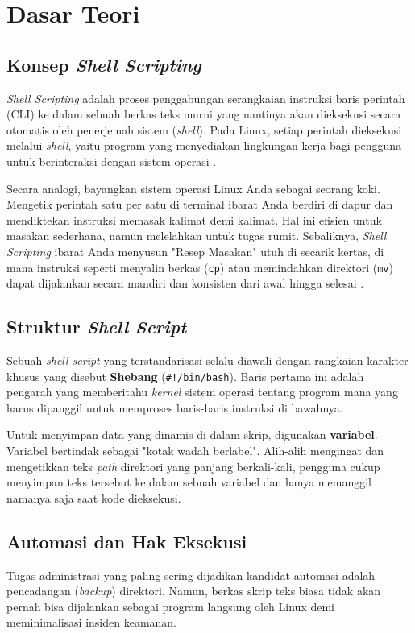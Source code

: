 \newpage
\section{Dasar Teori}

\subsection{Konsep \textit{Shell Scripting}}
\textit{Shell Scripting} adalah proses penggabungan serangkaian instruksi baris perintah (CLI) ke dalam sebuah berkas teks murni yang nantinya akan dieksekusi secara otomatis oleh penerjemah sistem (\textit{shell}). Pada Linux, setiap perintah dieksekusi melalui \textit{shell}, yaitu program yang menyediakan lingkungan kerja bagi pengguna untuk berinteraksi dengan sistem operasi \cite{robbins2005classic}. 

Secara analogi, bayangkan sistem operasi Linux Anda sebagai seorang koki. Mengetik perintah satu per satu di terminal ibarat Anda berdiri di dapur dan mendiktekan instruksi memasak kalimat demi kalimat. Hal ini efisien untuk masakan sederhana, namun melelahkan untuk tugas rumit. Sebaliknya, \textit{Shell Scripting} ibarat Anda menyusun "Resep Masakan" utuh di secarik kertas, di mana instruksi seperti menyalin berkas (\texttt{cp}) atau memindahkan direktori (\texttt{mv}) dapat dijalankan secara mandiri dan konsisten dari awal hingga selesai \cite{das2012unix}.

\subsection{Struktur \textit{Shell Script}}



Sebuah \textit{shell script} yang terstandarisasi selalu diawali dengan rangkaian karakter khusus yang disebut \textbf{Shebang} (\texttt{\#!/bin/bash}). Baris pertama ini adalah pengarah yang memberitahu \textit{kernel} sistem operasi tentang program mana yang harus dipanggil untuk memproses baris-baris instruksi di bawahnya.

Untuk menyimpan data yang dinamis di dalam skrip, digunakan \textbf{variabel}. Variabel bertindak sebagai "kotak wadah berlabel". Alih-alih mengingat dan mengetikkan teks \textit{path} direktori yang panjang berkali-kali, pengguna cukup menyimpan teks tersebut ke dalam sebuah variabel dan hanya memanggil namanya saja saat kode dieksekusi.

\subsection{Automasi dan Hak Eksekusi}
Tugas administrasi yang paling sering dijadikan kandidat automasi adalah pencadangan (\textit{backup}) direktori. Namun, berkas skrip teks biasa tidak akan pernah bisa dijalankan sebagai program langsung oleh Linux demi meminimalisasi insiden keamanan. 

